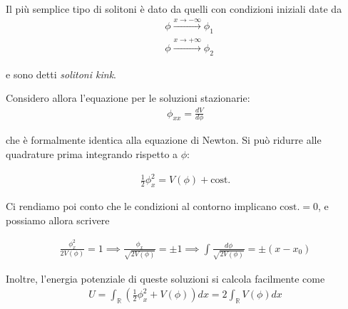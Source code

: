 \documentclass{report}
\begin{document}
Il più semplice tipo di solitoni è dato da quelli con condizioni iniziali date da 
\begin{align}
    &\phi \xrightarrow{x \rightarrow -\infty} \phi_1 \\
    &\phi \xrightarrow{x \rightarrow +\infty} \phi_2
\end{align}

e sono detti \emph{solitoni kink}.

Considero allora l'equazione per le soluzioni stazionarie: 
\begin{align}
    \phi_{xx} = \frac{dV}{d\phi}
\end{align}

che è formalmente identica alla equazione di Newton. Si può ridurre alle quadrature prima integrando rispetto a \(\phi\): 

\begin{align}
    \frac{1}{2}\phi_x^2 = V(\phi) + \text{cost.}
\end{align}

Ci rendiamo poi conto che le condizioni al contorno implicano \(\text{cost.} =0\), e possiamo allora scrivere 

\begin{align}
    \frac{\phi_x^2}{2V(\phi)} = 1 \implies \frac{\phi_x}{\sqrt{2V(\phi)}} = \pm 1 \implies \int \frac{d\phi}{\sqrt{2V(\phi)}} = \pm (x-x_0) 
\end{align}

Inoltre, l'energia potenziale di queste soluzioni si calcola facilmente come 
\begin{align}
    U = \int_\mathbb{R} \left(\frac{1}{2}\phi_x^2 + V(\phi) \right)dx = 2 \int_\mathbb{R} V(\phi)dx  
\end{align}
\end{document}
